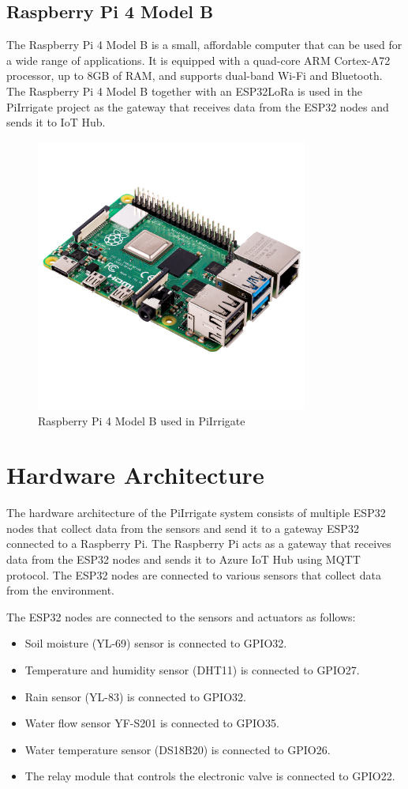 \subsection{Raspberry Pi 4 Model B}
The Raspberry Pi 4 Model B is a small, affordable computer that can be used for a wide range of applications.
It is equipped with a quad-core ARM Cortex-A72 processor, up to 8GB of RAM, and supports dual-band Wi-Fi and Bluetooth.
The Raspberry Pi 4 Model B together with an ESP32LoRa is used in the PiIrrigate project as the gateway that receives data from the ESP32 nodes
and sends it to IoT Hub.
\begin{figure}[H]
    \centering
    \includegraphics[width=0.8\textwidth]{images/raspberrypi.jpg}
    \caption{Raspberry Pi 4 Model B used in PiIrrigate}
    \label{fig:raspberrypi}
\end{figure}

\section{Hardware Architecture}
The hardware architecture of the PiIrrigate system consists 
of multiple ESP32 nodes that collect data from the sensors and send it to a gateway ESP32 connected to a Raspberry Pi.
The Raspberry Pi acts as a gateway that receives data from the ESP32 nodes and sends it to Azure IoT Hub using MQTT protocol.
The ESP32 nodes are connected to various sensors that collect data from the environment.

The ESP32 nodes are connected to the sensors and actuators as follows:
\begin{itemize}
  \item Soil moisture (YL-69) sensor is connected to GPIO32.
  \item Temperature and humidity sensor (DHT11) is connected to GPIO27.
  \item Rain sensor (YL-83) is connected to GPIO32.
  \item Water flow sensor {YF-S201} is connected to GPIO35.
  \item Water temperature sensor (DS18B20) is connected to GPIO26.
  \item The relay module that controls the electronic valve is connected to GPIO22.
\end{itemize}

